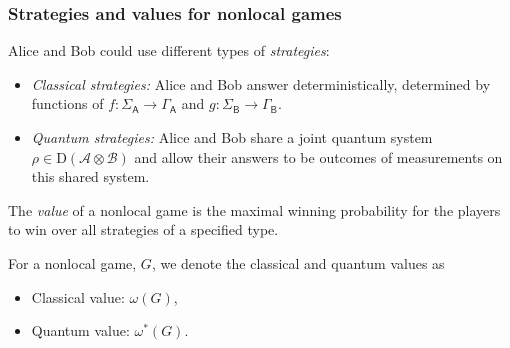 \documentclass{beamer}
\def\A{\mathcal{A}}
\def\B{\mathcal{B}}
\def \GammaA{\Gamma_{\reg{A}}}
\def \GammaB{\Gamma_{\reg{B}}}
\def \SigmaA{\Sigma_{\reg{A}}}
\def \SigmaB{\Sigma_{\reg{B}}}
\newcommand{\setft}[1]{\mathrm{#1}}
\newcommand{\Density}{\setft{D}}
\newcommand{\reg}[1]{\mathsf{#1}}
\begin{document}
\begin{frame}
	\frametitle{Strategies and values for nonlocal games}
	Alice and Bob could use different types of \emph{strategies}:
	\vspace{2mm}
	\begin{itemize}
		\item \emph{Classical strategies:} Alice and Bob answer deterministically, determined by functions of $f : \SigmaA \rightarrow \GammaA$ and $g : \SigmaB \rightarrow \GammaB$. 
		\vspace{5mm}
		\item \emph{Quantum strategies:} Alice and Bob share a joint quantum system $\rho \in \Density(\A \otimes \B)$ and allow their answers to be outcomes of measurements on this shared system.		
	\end{itemize}
	\pause 
	\vspace{5mm}
	The \emph{value} of a nonlocal game is the maximal winning probability for the players to win over all strategies of a specified type. 
	\vspace{2mm}
	
For a nonlocal game, $G$, we denote the classical and quantum values as 
	\begin{itemize}
		\item Classical value: $\omega(G)$,
		\item Quantum value: $\omega^*(G)$.
	\end{itemize}
\end{frame}
\end{document}
